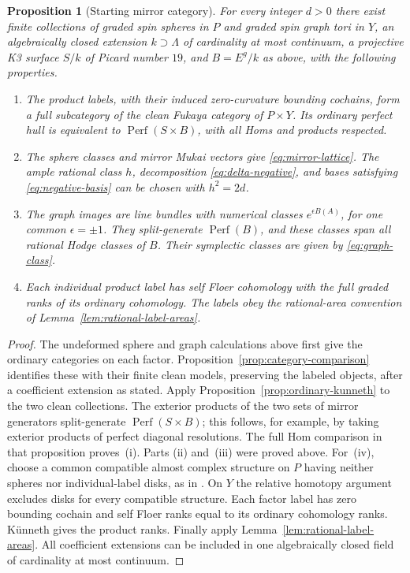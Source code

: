 \documentclass[11pt]{article}
\numberwithin{equation}{section}
\newtheorem{proposition}[theorem]{Proposition}
\theoremstyle{definition}
\theoremstyle{remark}
\begin{document}
\begin{proposition}[Starting mirror category]\label{prop:mirror-input}
For every integer $d>0$ there exist finite collections of graded spin
spheres in $P$ and graded spin graph tori in $Y$, an algebraically closed
extension $k\supset\Lambda$ of cardinality at most continuum, a projective
K3 surface $S/k$ of Picard number $19$, and $B=E^g/k$ as above, with
the following properties.
\begin{enumerate}[label=\textup{(\roman*)}]
\item The product labels, with their induced zero-curvature bounding
cochains, form a full subcategory of the clean Fukaya category of
$P\times Y$.  Its ordinary perfect hull is equivalent to
$\operatorname{Perf}(S\times B)$, with all Homs and products respected.
\item The sphere classes and mirror Mukai vectors give
\eqref{eq:mirror-lattice}.  The ample rational class $h$, decomposition
\eqref{eq:delta-negative}, and bases satisfying
\eqref{eq:negative-basis} can be chosen with $h^2=2d$.
\item The graph images are line bundles with numerical classes
$e^{\epsilon B(A)}$, for one common $\epsilon=\pm1$.  They
split-generate $\operatorname{Perf}(B)$, and these classes span all rational
Hodge classes of $B$.  Their symplectic classes are given by
\eqref{eq:graph-class}.
\item Each individual product label has self Floer cohomology with
the full graded ranks of its ordinary cohomology.  The labels obey
the rational-area convention of Lemma~\ref{lem:rational-label-areas}.
\end{enumerate}
\end{proposition}
\begin{proof}
The undeformed sphere and graph calculations above first give the
ordinary categories on each factor.  Proposition~\ref{prop:category-comparison}
identifies these with their finite clean models, preserving the labeled
objects, after a coefficient extension as stated.  Apply
Proposition~\ref{prop:ordinary-kunneth} to the two clean collections.
The exterior products of the two sets of mirror generators
split-generate $\operatorname{Perf}(S\times B)$; this follows, for example, by
taking exterior products of perfect diagonal resolutions.  The full
Hom comparison in that proposition proves~\textup{(i)}.  Parts
\textup{(ii)} and~\textup{(iii)} were proved above.  For~\textup{(iv)},
choose a common compatible almost complex structure on $P$ having
neither spheres nor individual-label disks, as in
\cite[Lemma~8.4]{HMS:SeidelQuartic}.  On $Y$ the relative homotopy argument excludes disks
for every compatible structure.  Each factor label has zero
bounding cochain and self Floer ranks equal to its ordinary
cohomology ranks.  K\"unneth gives the product ranks.  Finally apply
Lemma~\ref{lem:rational-label-areas}.  All coefficient extensions can
be included in one algebraically closed field of cardinality at
most continuum.
\end{proof}
\end{document}

